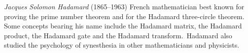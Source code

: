 \documentclass[12pt]{article}
\begin{document}
\emph{Jacques Solomon Hadamard} (1865--1963) French mathematician best known for proving the prime number theorem and for the Hadamard three-circle theorem. Some concepts bearing his name include the Hadamard matrix, the Hadamard product, the Hadamard gate and the Hadamard transform.\, Hadamard also studied the psychology of synesthesia in other mathematicians and physicists.
\end{document}
